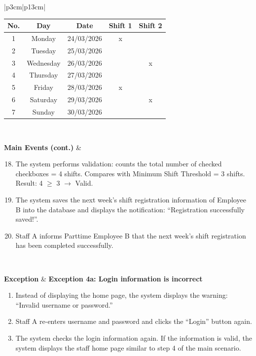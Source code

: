 \begin{longtable}{|p{3cm}|p{13cm}|}
\begin{enumerate}
    \begin{tabular}{|c|c|c|c|c|}
    \hline
    \textbf{No.} & \textbf{Day} & \textbf{Date} & \textbf{Shift 1} & \textbf{Shift 2} \\
    \hline
    1 & Monday & 24/03/2026 & x & \\
    \hline
    2 & Tuesday & 25/03/2026 & & \\
    \hline
    3 & Wednesday & 26/03/2026 & & x \\
    \hline
    4 & Thursday & 27/03/2026 & & \\
    \hline
    5 & Friday & 28/03/2026 & x & \\
    \hline
    6 & Saturday & 29/03/2026 & & x \\
    \hline
    7 & Sunday & 30/03/2026 & & \\
    \hline
    \end{tabular}
\end{enumerate} \\
\hline

\textbf{Main Events (cont.)} &
\begin{enumerate}
    \setcounter{enumi}{17}
    \item The system performs validation: counts the total number of checked checkboxes = 4 shifts. Compares with Minimum Shift Threshold = 3 shifts. Result: 4 $\geq$ 3 $\rightarrow$ Valid.
    \item The system saves the next week's shift registration information of Employee B into the database and displays the notification: ``Registration successfully saved!''.
    \item Staff A informs Parttime Employee B that the next week's shift registration has been completed successfully.
\end{enumerate} \\
\hline

\textbf{Exception} &
\textbf{Exception 4a: Login information is incorrect}
\begin{enumerate}
    \item[4.1.] Instead of displaying the home page, the system displays the warning: ``Invalid username or password.''
    \item[4.2.] Staff A re-enters username and password and clicks the ``Login'' button again.
    \item[4.3.] The system checks the login information again. If the information is valid, the system displays the staff home page similar to step 4 of the main scenario.
\end{enumerate} \\
\hline


\end{longtable}
